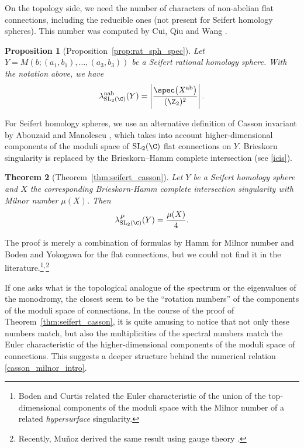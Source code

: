 \documentclass[10pt,a4paper]{amsart}
\newtheorem{Theorem}{Theorem}[section]
\newtheorem{Proposition}[Theorem]{Proposition}
\begin{document}
On the topology side, we need the number  of characters of non-abelian flat connections, including the reducible ones (not present for Seifert homology spheres). This number was computed by Cui, Qiu and Wang \cite{CuQiWa21}.

\begin{Proposition}[Proposition~\ref{prop:rat_sph_spec}]
Let $Y = M(b;(a_1, b_1), \dots, (a_3,b_3))$ be a Seifert rational homology sphere. With the notation above, we have
\[
	\lambda^{\rm nab}_{\operatorname{SL}_2(\C)}(Y) =\left\lvert\frac{\spec\bigl(X^{\rm ab}\bigr)}{(\Z_2)^2}\right\rvert.
\]
\end{Proposition}


For Seifert homology spheres, we use an alternative definition of Casson invariant  by Abouzaid and Manolescu \cite{AbMa20}, which takes into account higher-dimensional components of the moduli space of $\operatorname{SL}_2(\C)$ flat connections on $Y$. Brieskorn singularity is replaced by the Brieskorn--Hamm complete intersection (see \eqref{icis}).
	\begin{Theorem}[Theorem~\ref{thm:seifert_casson}]
		Let $Y$ be a Seifert homology sphere and $X$ the corresponding Brieskorn-Hamm complete intersection singularity with Milnor number $\mu(X)$. Then
		\begin{equation}\label{casson_milnor_intro}
			\lambda^{P}_{\operatorname{SL}_2(\C)}(Y) = \frac{\mu(X)}{4}.	
		\end{equation}
	\end{Theorem}
The proof is merely a combination of formulas by Hamm \cite{Ham72} for Milnor number and Boden and Yokogawa \cite{BoYo96} for the flat connections, but we could not find it in the literature.\footnote{Boden and Curtis \cite[p.~10]{BC06} related the Euler characteristic of the union of the top-dimensional components of the moduli space with the Milnor number of a related \emph{hypersurface} singularity.}$^{,}$\footnote{Recently, Mu\~noz derived the same result using gauge theory \cite[Corollary B]{munoz25}.}

If one asks what is the topological analogue of the spectrum or the eigenvalues of the monodromy, the closest seem to be the ``rotation numbers'' of the components of the moduli space of connections. In the course of the proof of Theorem~\ref{thm:seifert_casson}, it is quite amusing to notice that not only these numbers match, but also the multiplicities of the spectral numbers match the Euler characteristic of the higher-dimensional components of the moduli space of connections. This suggests a deeper structure behind the numerical relation \eqref{casson_milnor_intro}.
\end{document}
